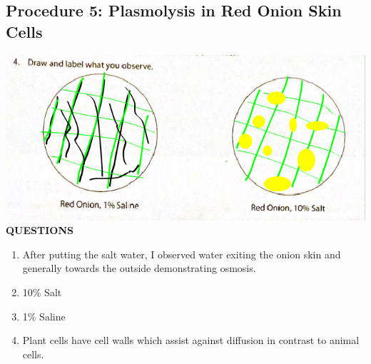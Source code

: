 \documentclass{article}
\begin{document}
\subsection{Procedure 5: Plasmolysis in Red Onion Skin Cells}
\includegraphics[width=\textwidth]{lab_four_image.png}
\textbf{QUESTIONS}
\begin{enumerate}[label=\textbf{\arabic*.}]
	\item
		After putting the salt water, I observed water exiting the onion skin and generally towards the outside demonstrating osmosis.
	\item
		10\% Salt
	\item
		1\% Saline
	\item
		Plant cells have cell walls which assist against diffusion in contrast to animal cells.
\end{enumerate}
\end{document}
